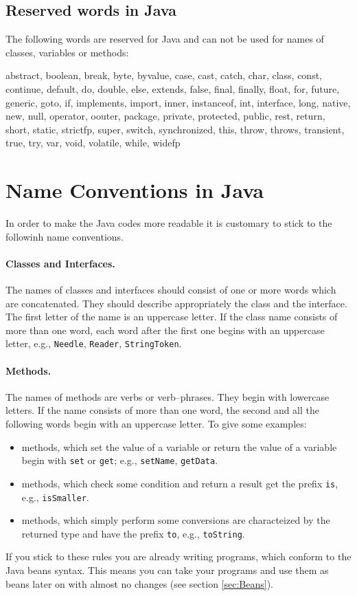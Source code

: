 \subsection{Reserved words in Java}
The following words are reserved for Java and can not be used for names
of classes, variables or methods:
\begin{sverbatim}
abstract, boolean, break, byte, byvalue, case, cast, catch, char,
class, const, continue, default, do, double, else, extends,
false, final, finally, float, for, future, generic, goto, if,
implements, import, inner, instanceof, int, interface, long,
native, new, null, operator, oouter, package, private, protected, 
public, rest, return, short, static, strictfp, super, switch, 
synchronized, this, throw, throws, transient, true, try, var,
void, volatile, while, widefp
\end{sverbatim}


\section{Name Conventions in Java}
In order to make the Java codes more readable it is customary to stick
to the followinh name conventions.

\paragraph{Classes and Interfaces.} The names of classes and interfaces
  should consist of one or more words which are concatenated. They
  should describe appropriately the class and the interface. 
  The first letter of the name is an uppercase letter. If the
  class name consists of more than one word, each word after the first
  one begins with an uppercase letter, e.g., \verb|Needle|,
  \verb|Reader|, \verb|StringToken|.

\paragraph{Methods.} The names of methods are verbs or verb--phrases. 
  They begin with lowercase letters. If the name consists of
  more than one word, the second and all the following words begin
  with an uppercase letter. To give some examples:
\begin{itemize}
\item methods, which set the value of a variable or return the value of
  a variable begin with \verb|set| or \verb|get|; e.g.,
  \verb|setName|, \verb|getData|.
\item methods, which check some condition and return a result  get the
  prefix \verb|is|, e.g., \verb|isSmaller|.
\item methods, which simply perform some conversions are characteized
  by the returned type and have the prefix \verb|to|, e.g.,
  \verb|toString|.
\end{itemize}
If you stick to these rules you are already writing programs, which
conform to the Java beans syntax. This means you can take your
programs and use them as beans later on with almost no changes
(see section \ref{sec:Beans}).


